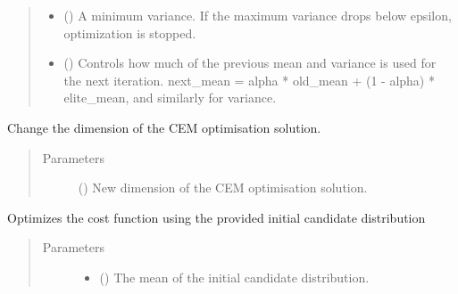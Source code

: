 \documentclass[letterpaper,10pt,english,openany,oneside]{sphinxmanual}
\begin{document}
\begin{fulllineitems}
\begin{quote}
\begin{description}
\begin{itemize}
\item {} 
 () \textendash{} A minimum variance. If the maximum variance drops below epsilon, optimization is stopped.

\item {} 
 () \textendash{} Controls how much of the previous mean and variance is used for the next iteration. next\_mean = alpha * old\_mean + (1 - alpha) * elite\_mean, and similarly for variance.

\end{itemize}

\end{description}\end{quote}

\begin{fulllineitems}
\label{\detokenize{_modules/misc.optimizers:misc.optimizers.cem.CEMOptimizer.changeSolDim}}
Change the dimension of the CEM optimisation solution.
\begin{quote}\begin{description}
\item[{Parameters}] \leavevmode
{} () \textendash{} New dimension of the CEM optimisation solution.

\end{description}\end{quote}

\end{fulllineitems}


\begin{fulllineitems}
\label{\detokenize{_modules/misc.optimizers:misc.optimizers.cem.CEMOptimizer.obtain_solution}}
Optimizes the cost function using the provided initial candidate distribution
\begin{quote}\begin{description}
\item[{Parameters}] \leavevmode\begin{itemize}
\item {} 
 () \textendash{} The mean of the initial candidate distribution.


\end{itemize}
\end{description}
\end{quote}
\end{fulllineitems}
\end{fulllineitems}
\end{document}
